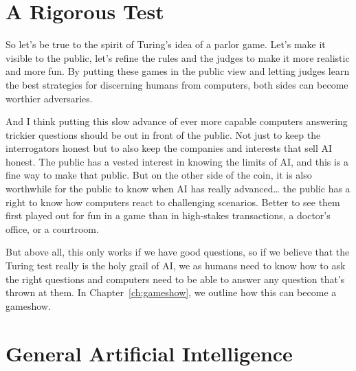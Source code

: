 \section{A Rigorous Test}
\label{sec:turing:test}

So let’s be true to the spirit of Turing’s idea of a parlor game.
Let’s make it visible to the public, let’s refine the rules and the
judges to make it more realistic and more fun.  By putting these games
in the public view and letting judges learn the best strategies for
discerning humans from computers, both sides can become worthier
adversaries.

And I think putting this slow advance of ever more capable computers
answering trickier questions should be out in front of the public.
Not just to keep the interrogators honest but to also keep the
companies and interests that sell AI honest.  The public has a vested
interest in knowing the limits of AI, and this is a fine way to make
that public.  But on the other side of the coin, it is also worthwhile
for the public to know when AI has really advanced… the public has a
right to know how computers react to challenging scenarios.  Better to
see them first played out for fun in a game than in high-stakes
transactions, a doctor’s office, or a courtroom.

But above all, this only works if we have good questions, so if we
believe that the Turing test really is the holy grail of AI, we as
humans need to know how to ask the right questions and computers need
to be able to answer any question that’s thrown at them.  In
Chapter~\ref{ch:gameshow}, we outline how this can become a gameshow.

\section{General Artificial Intelligence}
\label{sec:turing:gai}
